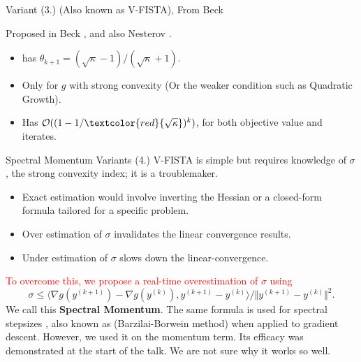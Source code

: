 \documentclass[11pt]{beamer}
\theoremstyle{definition}
\begin{document}
    \begin{frame}{Variant (3.) (Also known as V-FISTA), From Beck}
        \begin{algorithm}[H]
            \begin{tiny}
                \begin{algorithmic}[1]
                    \ENDFOR
                \end{algorithmic}
                \caption{Generic FISTA}    
            \end{tiny}
        \end{algorithm}
        Proposed in Beck \cite{beck_first-order_nodate}, and also Nesterov \cite{nesterov_lecture_2018}. 
        \begin{itemize}
            \item has $\theta_{k + 1} = (\sqrt{\kappa} - 1)/(\sqrt{\kappa} + 1)$. 
            \item Only for $g$ with strong convexity (Or the weaker condition such as Quadratic Growth). 
            \item Has $\mathcal O((1 - 1/\textcolor{red}{\sqrt{\kappa}})^k)$, for both objective value and iterates. 
        \end{itemize}
    \end{frame}
    \begin{frame}{Spectral Momentum Variants (4.)}
        V-FISTA is simple but requires knowledge of $\sigma$, the strong convexity index; it is a troublemaker. 
        \begin{itemize}
            \item Exact estimation would involve inverting the Hessian or a closed-form formula tailored for a specific problem. 
            \item Over estimation of $\sigma$ invalidates the linear convergence results. 
            \item Under estimation of $\sigma$ slows down the linear-convergence. 
        \end{itemize}
        \textcolor{red}{To overcome this, we propose a real-time overestimation of $\sigma$ using}
        \[
            \sigma \le \langle \nabla g(y^{(k + 1)}) - \nabla g(y^{(k)}), y^{(k + 1)} - y^{(k)}\rangle/ 
                    \Vert y^{(k + 1)} - y^{(k)}\Vert^2. 
        \]
        We call this \textbf{Spectral Momentum}. 
        The same formula is used for spectral stepsizes \cite[4.1]{goldstein_field_2016}, also known as (Barzilai-Borwein method) when applied to gradient descent. 
        However, we used it on the momentum term. 
        Its efficacy was demonstrated at the start of the talk. 
        We are not sure why it works so well. 
    \end{frame}
\end{document}
